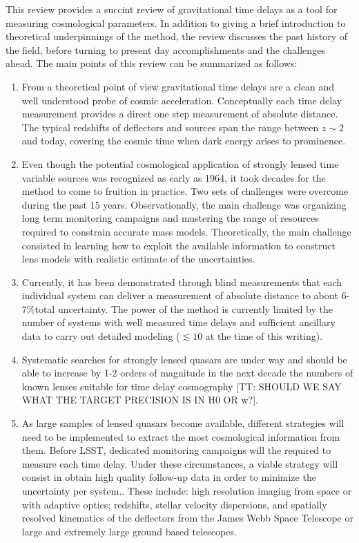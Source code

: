 This review provides a succint review of gravitational time delays as
a tool for measuring cosmological parameters. In addition to giving a
brief introduction to theoretical underpinnings of the method, the
review discusses the past history of the field, before turning to
present day accomplishments and the challenges ahead. The main points
of this review can be summarized as follows:

\begin{enumerate}
\item From a theoretical point of view gravitational time delays are a clean and well understood probe of cosmic acceleration. Conceptually each time delay measurement provides a direct one step measurement of absolute distance. The typical redshifts of deflectors and sources span the range between $z\sim2$ and today, covering the cosmic time when dark energy arises to prominence.
\item Even though the potential cosmological application of strongly lensed time variable sources was recognized as early as 1964, it took decades for the method to come to fruition in practice. Two sets of challenges were overcome during the past 15 years. Observationally, the main challenge was organizing long term monitoring campaigns and mustering the range of resources required to constrain accurate mass models. Theoretically, the main challenge consisted in learning how to exploit the available information to construct lens models with realistic estimate of the uncertainties.
\item Currently, it has been demonstrated through blind measurements that each individual system can deliver a measurement of absolute distance to about 6-7\%total uncertainty.  The power of the method is currently limited by the number of systems with well measured time delays and sufficient ancillary data to carry out detailed modeling ($\lesssim10$ at the time of this writing).
\item Systematic searches for strongly lensed quasars are under way and should be able to increase by 1-2 orders of magnitude in the next decade the numbers of known lenses suitable for time delay cosmography [TT: SHOULD WE SAY WHAT THE TARGET PRECISION IS IN H0 OR w?].
\item As large samples of lensed quasars become available, different strategies will need to be implemented to extract the most cosmological information from them. Before LSST, dedicated monitoring campaigns will the required to measure each time delay. Under these circumstances, a viable strategy will consist in obtain high quality follow-up data in order to minimize the uncertainty per system.. These include: high resolution imaging from space or with adaptive optics; redshifts, stellar velocity dispersions, and spatially resolved kinematics of the deflectors from the James Webb Space Telescope or large and extremely large ground based telescopes.

\end{enumerate}
